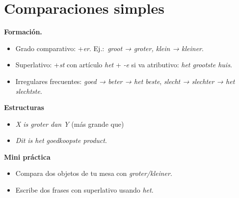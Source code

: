 \section{Comparaciones simples}
\textbf{Formación.}
\begin{itemize}[leftmargin=*]
  \item Grado comparativo: +\textit{er}. Ej.:\ \textit{groot → groter, klein → kleiner}.
  \item Superlativo: +\textit{st} con artículo \textit{het} + \textit{-e} si va atributivo: \textit{het grootste huis}.
  \item Irregulares frecuentes: \textit{goed → beter → het beste}, \textit{slecht → slechter → het slechtste}.
\end{itemize}

\textbf{Estructuras}
\begin{itemize}[leftmargin=*]
  \item \textit{X is groter dan Y} (más grande que)
  \item \textit{Dit is het goedkoopste product}.
\end{itemize}

\textbf{Mini práctica}
\begin{itemize}[leftmargin=*]
  \item Compara dos objetos de tu mesa con \textit{groter/kleiner}.
  \item Escribe dos frases con superlativo usando \textit{het}.
\end{itemize}
